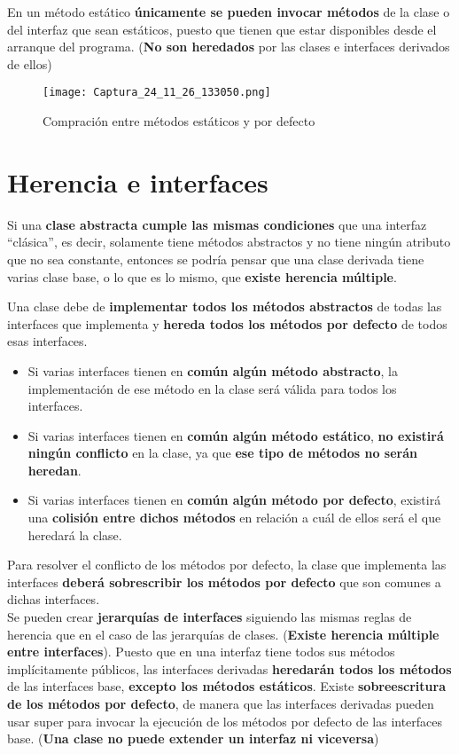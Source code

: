 \documentclass{article}
\begin{document}
En un método estático \textbf{únicamente se pueden invocar métodos} de la clase o del interfaz que sean estáticos, puesto que tienen que estar disponibles desde el arranque del programa. (\textbf{No son heredados} por las clases e interfaces derivados de ellos)

\begin{figure}[h]
    \centering
    \texttt{[image: Captura\_24\_11\_26\_133050.png]}
    \caption{Compración entre métodos estáticos y por defecto}
\end{figure}

\newpage

\section{Herencia e interfaces}
Si una \textbf{clase abstracta cumple las mismas condiciones} que una interfaz “clásica”, es decir, solamente tiene métodos abstractos y no tiene ningún atributo que no sea constante, entonces se podría pensar que una clase derivada tiene varias clase base, o lo que es lo mismo, que \textbf{existe herencia múltiple}.

Una clase debe de \textbf{implementar todos los métodos abstractos} de todas las interfaces que implementa y \textbf{hereda todos los métodos por defecto} de todos esas interfaces.
\begin{itemize}
    \item Si varias interfaces tienen en \textbf{común algún método abstracto}, la implementación de ese método en la clase será válida para todos los interfaces.
    \item Si varias interfaces tienen en \textbf{común algún método estático}, \textbf{no existirá ningún conflicto} en la clase, ya que \textbf{ese tipo de métodos no serán heredan}.
    \item Si varias interfaces tienen en \textbf{común algún método por defecto}, existirá una \textbf{colisión entre dichos métodos} en relación a cuál de ellos será el que heredará la clase.
\end{itemize}

Para resolver el conflicto de los métodos por defecto, la clase que implementa las interfaces \textbf{deberá sobrescribir los métodos por defecto} que son comunes a dichas interfaces. \\  

Se pueden crear \textbf{jerarquías de interfaces} siguiendo las mismas reglas de herencia que en el caso de las jerarquías de clases. (\textbf{Existe herencia múltiple entre interfaces}).
Puesto que en una interfaz tiene todos sus métodos implícitamente públicos, las interfaces derivadas \textbf{heredarán todos los métodos} de las interfaces base, \textbf{excepto los métodos estáticos}.
Existe \textbf{sobreescritura de los métodos por defecto}, de manera que las interfaces derivadas pueden usar super para invocar la ejecución de los métodos por defecto de las interfaces base. (\textbf{Una clase no puede extender un interfaz ni viceversa})
\end{document}
